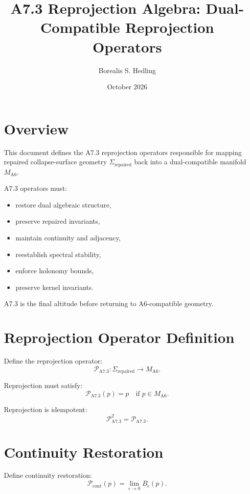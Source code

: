 \documentclass[11pt]{article}
\title{A7.3 Reprojection Algebra: Dual-Compatible Reprojection Operators}
\author{Borealis S. Hedling}
\date{October 2026}
\begin{document}
\maketitle

\section*{Overview}

This document defines the A7.3 reprojection operators responsible for
mapping repaired collapse-surface geometry $\Sigma_{\mathrm{repaired}}$
back into a dual-compatible manifold $M_{\mathrm{A6}}$.

A7.3 operators must:
\begin{itemize}
  \item restore dual algebraic structure,
  \item preserve repaired invariants,
  \item maintain continuity and adjacency,
  \item reestablish spectral stability,
  \item enforce holonomy bounds,
  \item preserve kernel invariants.
\end{itemize}

A7.3 is the final altitude before returning to A6-compatible geometry.

\section{Reprojection Operator Definition}

Define the reprojection operator:
\[
\mathcal{P}_{\mathrm{A7.3}} :
\Sigma_{\mathrm{repaired}} \to M_{\mathrm{A6}}.
\]

Reprojection must satisfy:
\[
\mathcal{P}_{\mathrm{A7.3}}(p) = p
\quad \text{if } p \in M_{\mathrm{A6}}.
\]

Reprojection is idempotent:
\[
\mathcal{P}_{\mathrm{A7.3}}^2 = \mathcal{P}_{\mathrm{A7.3}}.
\]

\section{Continuity Restoration}

Define continuity restoration:
\[
\mathcal{P}_{\mathrm{cont}}(p)
  = \lim_{\epsilon \to 0} B_\epsilon(p).
\]
\end{document}
